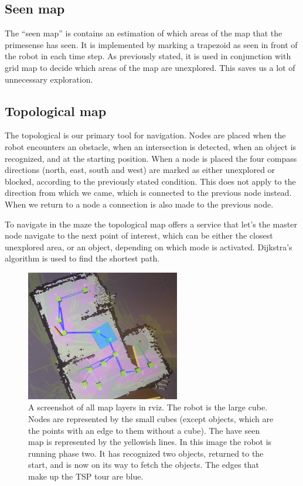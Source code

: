 \subsection{Seen map}
The ``seen map'' is contains an estimation of which areas of the map that the primesense has seen. 
It is implemented by marking a trapezoid as seen in front of the robot in each time step. 
As previously stated, it is used in conjunction with grid map to decide which areas of the map are unexplored. 
This saves us a lot of unnecessary exploration.

\subsection{Topological map}
The topological is our primary tool for navigation. Nodes are placed when the robot encounters an obstacle, when an intersection is detected, when an object is recognized, and at the starting position. When a node is placed the four compass directions (north, east, south and west) are marked as either unexplored or blocked, according to the previously stated condition. This does not apply to the direction from which we came, which is connected to the previous node instead. When we return to a node a connection is also made to the previous node.

To navigate in the maze the topological map offers a service that let's the master node navigate to the next point of interest, which can be either the closest unexplored area, or an object, depending on which mode is activated. Dijkstra's algorithm is used to find the shortest path.

\begin{figure}[h]
\begin{center}
\includegraphics[width=0.6\textwidth]{figures/map.png}
\end{center}
\caption{A screenshot of all map layers in rviz. The robot is the large cube. Nodes are represented by the small cubes (except objects, which are the points with an edge to them without a cube). The have seen map is represented by the yellowish lines. In this image the robot is running phase two. It has recognized two objects, returned to the start, and is now on its way to fetch the objects. The edges that make up the TSP tour are blue.}
\label{fig:arch_controller}
\end{figure}

